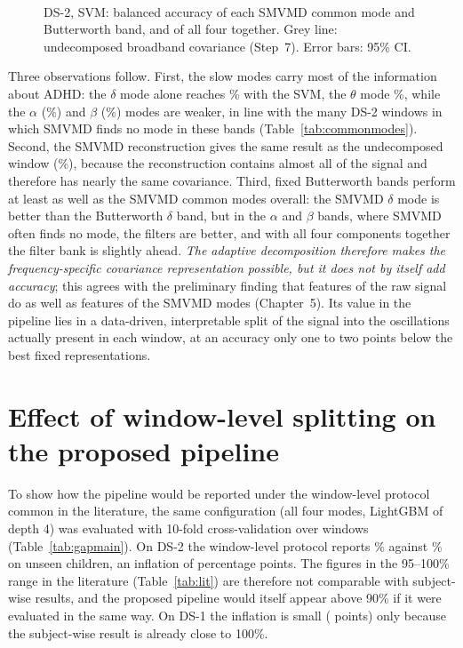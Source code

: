 \begin{table}[H]
\caption{DS-2: balanced window accuracy (\%) of single and combined components, SMVMD common
modes against Butterworth bands with the same edges.}
\label{tab:modes}\centering
{}\\[2pt]
{\footnotesize \dstwonote}
\end{table}

\begin{figure}[H]\centering
{}
\caption{DS-2, SVM: balanced accuracy of each SMVMD common mode and Butterworth band, and of all
four together. Grey line: undecomposed broadband covariance (Step~7). Error bars: 95\% CI.}
\label{fig:modes}
\end{figure}

Three observations follow. First, the slow modes carry most of the information about ADHD: the
$\delta$ mode alone reaches \% with the SVM, the $\theta$ mode
\%, while the $\alpha$ (\%) and $\beta$
(\%) modes are weaker, in line with the many DS-2 windows in which SMVMD finds
no mode in these bands (Table~\ref{tab:commonmodes}). Second, the SMVMD reconstruction gives the
same result as the undecomposed window (\%), because the reconstruction
contains almost all of the signal and therefore has nearly the same covariance. Third, fixed
Butterworth bands perform at least as well as the SMVMD common modes overall: the SMVMD
$\delta$ mode is better than the Butterworth $\delta$ band, but in the $\alpha$ and $\beta$
bands, where SMVMD often finds no mode, the filters are better, and with all four components
together the filter bank is slightly ahead. \emph{The adaptive decomposition therefore makes the frequency-specific covariance
representation possible, but it does not by itself add accuracy}; this agrees with the
preliminary finding that features of the raw signal do as well as features of the SMVMD modes
(Chapter~5). Its value in the pipeline lies in a data-driven, interpretable split of the signal
into the oscillations actually present in each window, at an accuracy only one to two points
below the best fixed representations.

\section{Effect of window-level splitting on the proposed pipeline}
To show how the pipeline would be reported under the window-level protocol common in the
literature, the same configuration (all four modes, LightGBM of depth 4) was evaluated with
10-fold cross-validation over windows (Table~\ref{tab:gapmain}). On DS-2 the window-level
protocol reports \% against \% on unseen children, an inflation
of  percentage points. The figures in the 95--100\% range in the literature
(Table~\ref{tab:lit}) are therefore not comparable with subject-wise results, and the proposed
pipeline would itself appear above 90\% if it were evaluated in the same way. On DS-1 the
inflation is small ( points) only because the subject-wise result is
already close to 100\%.

